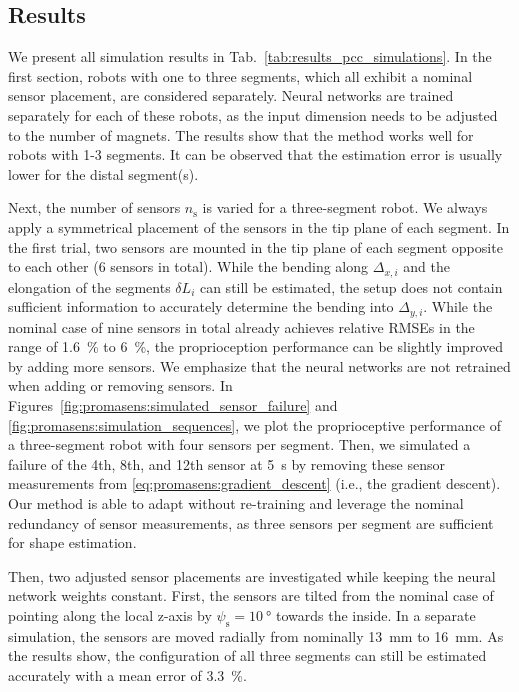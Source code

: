 \subsection{Results}\label{sub:promasens:simulation_pcc_results}
We present all simulation results in Tab.~\ref{tab:results_pcc_simulations}.
In the first section, robots with one to three segments, which all exhibit a nominal sensor placement, are considered separately. Neural networks are trained separately for each of these robots, as the input dimension needs to be adjusted to the number of magnets.
The results show that the method works well for robots with 1-3 segments. It can be observed that the estimation error is usually lower for the distal segment(s).

Next, the number of sensors $n_\mathrm{s}$ is varied for a three-segment robot. We always apply a symmetrical placement of the sensors in the tip plane of each segment. In the first trial, two sensors are mounted in the tip plane of each segment opposite to each other (6 sensors in total). While the bending along $\Delta_{x,i}$ and the elongation of the segments $\delta L_i$ can still be estimated, the setup does not contain sufficient information to accurately determine the bending into $\Delta_{y,i}$.
While the nominal case of nine sensors in total already achieves relative RMSEs in the range of \SI{1.6}{\percent} to \SI{6}{\percent}, the proprioception performance can be slightly improved by adding more sensors.
We emphasize that the neural networks are not retrained when adding or removing sensors.
In Figures~\ref{fig:promasens:simulated_sensor_failure} and \ref{fig:promasens:simulation_sequences}, we plot the proprioceptive performance of a three-segment robot with four sensors per segment. Then, we simulated a failure of the 4th, 8th, and 12th sensor at \SI{5}{s} by removing these sensor measurements from \eqref{eq:promasens:gradient_descent} (i.e., the gradient descent). Our method is able to adapt without re-training and leverage the nominal redundancy of sensor measurements, as three sensors per segment are sufficient for shape estimation.

Then, two adjusted sensor placements are investigated while keeping the neural network weights constant. First, the sensors are tilted from the nominal case of pointing along the local z-axis by $\psi_\mathrm{s} = \SI{10}{\degree}$ towards the inside. In a separate simulation, the sensors are moved radially from nominally \SI{13}{mm} to \SI{16}{mm}. As the results show, the configuration of all three segments can still be estimated accurately with a mean error of \SI{3.3}{\percent}.

